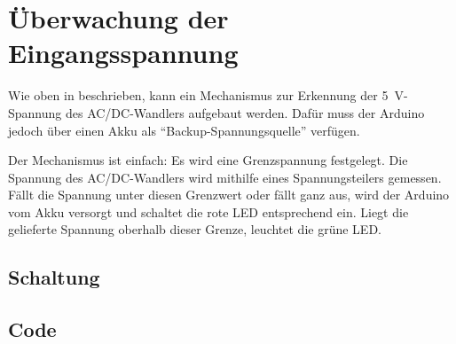 \section{Überwachung der Eingangsspannung}

Wie oben in  beschrieben, kann ein Mechanismus zur Erkennung der 5~V-Spannung des AC/DC-Wandlers aufgebaut werden. Dafür muss der Arduino jedoch über einen Akku als ``Backup-Spannungsquelle'' verfügen.
	
	Der Mechanismus ist einfach: Es wird eine Grenzspannung festgelegt. Die Spannung des AC/DC-Wandlers wird mithilfe eines Spannungsteilers gemessen. Fällt die Spannung unter diesen Grenzwert oder fällt ganz aus, wird der Arduino vom Akku versorgt und schaltet die rote LED entsprechend ein. Liegt die gelieferte Spannung oberhalb dieser Grenze, leuchtet die grüne LED.
	
	\subsection{Schaltung}
	\subsection{Code}
	{
	}
	
	
	

